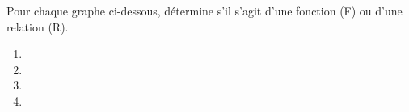 %
%
    Pour chaque graphe ci-dessous, détermine s'il s'agit d'une fonction (F) ou d'une relation (R).
    \begin{enumerate}[cols=4]
        \item \blank[width=2cm]{} 
        \item \blank[width=2cm]{} 
        \item \blank[width=2cm]{} 
        \item \blank[width=2cm]{} 
    \end{enumerate}
